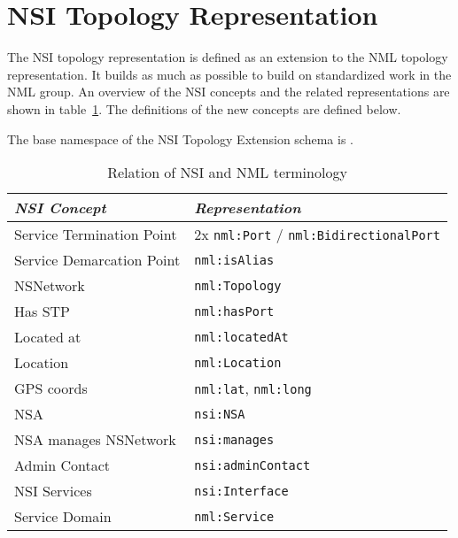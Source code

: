 \documentclass[12pt]{article}  %
\begin{document}
\section{NSI Topology Representation} %
\label{sec:nsi_topology_representation}

 The NSI topology representation is defined as an extension to the NML topology 
representation. It builds as much as possible to build on standardized work in the NML group.
An overview of the NSI concepts and the related representations are shown in table~\ref{tab:nsi-nml}.
The definitions of the new concepts are defined below.

The base namespace of the NSI Topology Extension schema is .

\begin{table}[b]
\begin{center}

  \begin{tabular}{|l|l|}
\hline
     \textit{NSI Concept} &                               \textit{Representation}\\
\hline
Service Termination Point & 2x \texttt{nml:Port} / \texttt{nml:BidirectionalPort}\\
\hline
Service Demarcation Point &                                  \texttt{nml:isAlias}\\
\hline
                NSNetwork &                                 \texttt{nml:Topology}\\
\hline
                  Has STP &                                  \texttt{nml:hasPort}\\
\hline
               Located at &                                \texttt{nml:locatedAt}\\
\hline
                 Location &                                 \texttt{nml:Location}\\
\hline
               GPS coords &                   \texttt{nml:lat}, \texttt{nml:long}\\
\hline
                      NSA &                                      \texttt{nsi:NSA}\\
\hline
    NSA manages NSNetwork &                                  \texttt{nsi:manages}\\
\hline
            Admin Contact &                             \texttt{nsi:adminContact}\\
\hline
             NSI Services &                                \texttt{nsi:Interface}\\
\hline
        Service Domain   &                          \texttt{nml:Service}\\
\hline
\end{tabular}
\caption{Relation of NSI and NML terminology}\label{tab:nsi-nml}
  \end{center}
\end{table}
\end{document}
